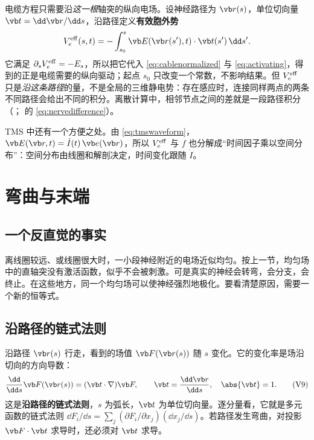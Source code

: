 电缆方程只需要沿\emph{这一根}轴突的纵向电场。设神经路径为 $\vb r(s)$，单位切向量 $\vb t=\dd\vb r/\dd s$，沿路径定义\textbf{有效胞外势}
\begin{equation}
V_e^{\rm eff}(s,t)=-\int_{s_0}^{s}\vb E(\vb r(s'),t)\cdot\vb t(s')\,\dd s'.
\label{eq:neuro-veff}
\end{equation}
它满足 $\partial_sV_e^{\rm eff}=-E_s$，所以把它代入 \eqref{eq:cablenormalized} 与 \eqref{eq:activating}，得到的正是电缆需要的纵向驱动；起点 $s_0$ 只改变一个常数，不影响结果。但 $V_e^{\rm eff}$ 只是\emph{沿这条路径}的量，不是全局的三维静电势：存在感应时，连接同样两点的两条不同路径会给出不同的积分。离散计算中，相邻节点之间的差就是一段路径积分（； 的 \eqref{eq:nervedifference}）。

TMS 中还有一个方便之处。由 \eqref{eq:tmswaveform}，$\vb E(\vb r,t)=\dot I(t)\,\vb e(\vb r)$，所以 $V_e^{\rm eff}$ 与 $f$ 也分解成“时间因子乘以空间分布”：空间分布由线圈和解剖决定，时间变化跟随 $\dot I$。

\section{弯曲与末端}\label{sec:neuro-bends}

\subsection{一个反直觉的事实}
离线圈较远、或线圈很大时，一小段神经附近的电场近似均匀。按上一节，均匀场中的直轴突没有激活函数，似乎不会被刺激。可是真实的神经会转弯，会分支，会终止。在这些地方，同一个均匀场可以使神经强烈地极化。要看清楚原因，需要一个新的恒等式。

\subsection{沿路径的链式法则}
沿路径 $\vb r(s)$ 行走，看到的场值 $\vb F(\vb r(s))$ 随 $s$ 变化。它的变化率是场沿切向的方向导数：
\begin{equation}
\frac{\dd}{\dd s}\vb F(\vb r(s))
=(\vb t\cdot\nabla)\vb F,
\qquad \vb t=\frac{\dd\vb r}{\dd s},\quad \abs{\vb t}=1.
\tag{V9}\label{id:path}
\end{equation}
这是\textbf{沿路径的链式法则}，$s$ 为弧长，$\vb t$ 为单位切向量。逐分量看，它就是多元函数的链式法则 $\dd F_i/\dd s=\sum_j(\partial F_i/\partial x_j)(\dd x_j/\dd s)$。若路径发生弯曲，对投影 $\vb F\cdot\vb t$ 求导时，还必须对 $\vb t$ 求导。

